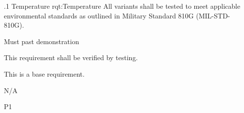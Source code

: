 

\ONERQMTVKSA
{\RqtNumberBase.1}
{Temperature}
{rqt:Temperature}
{All \ThisSystem variants shall be tested to meet applicable environmental standards as outlined in Military Standard 810G (MIL-STD-810G).}
{
	\item [Phase 1] Must past demonstration
}
{This requirement shall be verified by testing.}
{
\item [N/A] This is a base requirement.
}
{
	\item N/A
}
{P1}
